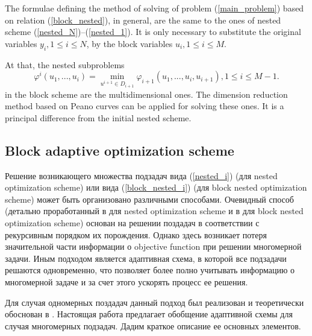 \documentclass[runningheads]{llncs}
\begin{document}
The formulae defining the method of solving of problem (\ref{main_problem}) 
based on relation (\ref{block_nested}), in general, are the same to the ones 
of nested scheme (\ref{nested_N})--(\ref{nested_1}). It is only necessary to 
substitute the original variables $y_i, 1\leq i \leq N$,  by the block 
variables $u_i, 1\leq i \leq M$. 

At that, the nested subproblems 
\begin{equation}\label{block_nested_i}
\varphi^i(u_1,...,u_i) = \min_{u^{i+1}\in D_{i+1}} \varphi_{i+1}(u_1,...,u_i,u
_{i+1}), 1\leq i\leq M-1.
\end{equation}
in the block scheme are the multidimensional ones. The dimension reduction 
method based on Peano curves can be applied for solving these ones. It is a 
principal difference from the initial nested scheme. 

\subsection{Block adaptive optimization scheme}

\Russian
Решение возникающего множества подзадач вида (\ref{nested_i}) (для nested optimization scheme) или вида (\ref{block_nested_i}) (для block nested optimization scheme) может быть организовано различными способами. 
Очевидный способ (детально проработанный в \cite{Grishagin2001,Grishagin2015} для nested optimization scheme и в \cite{Barkalov2014,Barkalov2016} для block nested optimization scheme) основан на решении поздадач в соответствии с рекурсивным порядком их порождения. Однако здесь возникает потеря значительной части информации о objective function при решении многомерной задачи. Иным  подходом является адаптивная схема, в которой все подзадачи решаются одновременно, что позволяет более полно учитывать информацию о многомерной задаче и за счет этого ускорять процесс ее решения.

Для случая одномерных поздадач данный подход был реализован и теоретически обоснован в \cite{Grishagin2016,Grishagin2016_1,Grishagin2018}. Настоящая работа предлагает обобщение адаптивной схемы для случая многомерных подзадач.
Дадим краткое описание ее основных элементов.
\end{document}
